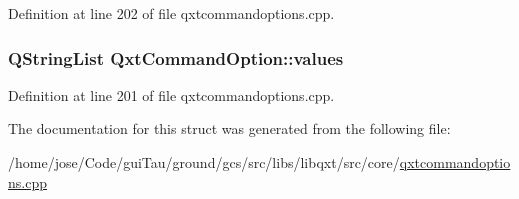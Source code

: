 Definition at line 202 of file qxtcommandoptions.\-cpp.

\hypertarget{struct_qxt_command_option_afb945ec7fd98e736458c99590ea4efb4}{
\subsubsection[{values}]{\setlength{\rightskip}{0pt plus 5cm}Q\-String\-List Qxt\-Command\-Option\-::values}}\label{struct_qxt_command_option_afb945ec7fd98e736458c99590ea4efb4}


Definition at line 201 of file qxtcommandoptions.\-cpp.



The documentation for this struct was generated from the following file\-:\begin{DoxyCompactItemize}
\item 
/home/jose/\-Code/gui\-Tau/ground/gcs/src/libs/libqxt/src/core/\hyperlink{qxtcommandoptions_8cpp}{qxtcommandoptions.\-cpp}\end{DoxyCompactItemize}
